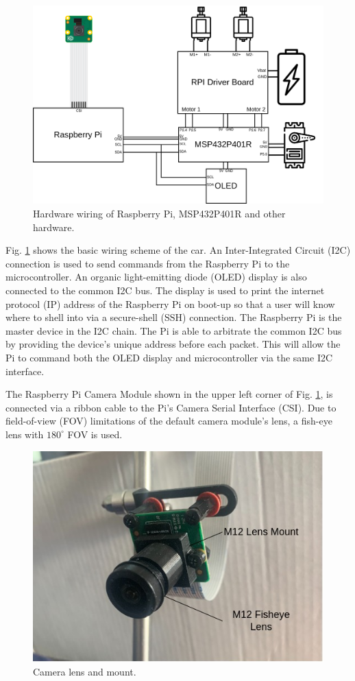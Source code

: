 \documentclass{article}
\begin{document}
\begin{figure}[htb]
	\centering
	\centerline{\includegraphics[width=1.0\linewidth]{wiring}}
	\caption{Hardware wiring of Raspberry Pi, MSP432P401R and other hardware.}
	\label{fig:hardware}
\end{figure}

Fig. \ref{fig:hardware} shows the basic wiring scheme of the car. An Inter-Integrated Circuit (I2C) connection is used to send commands from the Raspberry Pi to the microcontroller. An organic light-emitting diode (OLED) display is also connected to the common I2C bus. The display is used to print the internet protocol (IP) address of the Raspberry Pi on boot-up so that a user will know where to shell into via a secure-shell (SSH) connection. The Raspberry Pi is the master device in the I2C chain. The Pi is able to arbitrate the common I2C bus by providing the device's unique address before each packet. This will allow the Pi to command both the OLED display and microcontroller via the same I2C interface.

The Raspberry Pi Camera Module shown in the upper left corner of Fig. \ref{fig:hardware}, is connected via a ribbon cable to the Pi's Camera Serial Interface (CSI). Due to field-of-view (FOV) limitations of the default camera module's lens, a fish-eye lens with $180^{\circ}$ FOV is used.

\begin{figure}[htb]
	\centering
	\centerline{\includegraphics[width=0.7\linewidth]{camera_annotated}}
	\caption{Camera lens and mount.}
	\label{fig:camera}
\end{figure}
\end{document}
